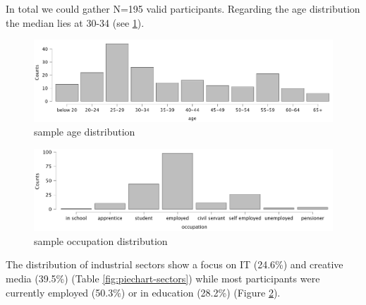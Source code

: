\documentclass[
  a4paper,  %
  twoside,  %
  bibliography=totoc,
  headsepline,
  cleardoublepage=empty,
  parskip=half,
  draft=false
]{scrbook}
\begin{document}
In total we could gather N=195 valid participants. Regarding the age distribution the median lies at 30-34 (see \ref{fig:age-distribution}).
\begin{figure}[h]
  \centering
  \includegraphics[width=1\textwidth]{graphics/images/statistics/age-plot.png}
  \caption{sample age distribution}
  \label{fig:age-distribution}
\end{figure}
\begin{figure}[h]
  \centering
  \includegraphics[width=1\textwidth]{graphics/images/statistics/occupation.png}
  \caption{sample occupation distribution}
  \label{fig:occupation-plot}
\end{figure}
The distribution of industrial sectors show a focus on IT (24.6\%) and creative media (39.5\%) (Table \ref{fig:piechart-sectors}) while most participants were currently employed (50.3\%) or in education (28.2\%) (Figure \ref{fig:occupation-plot}). 
\end{document}
